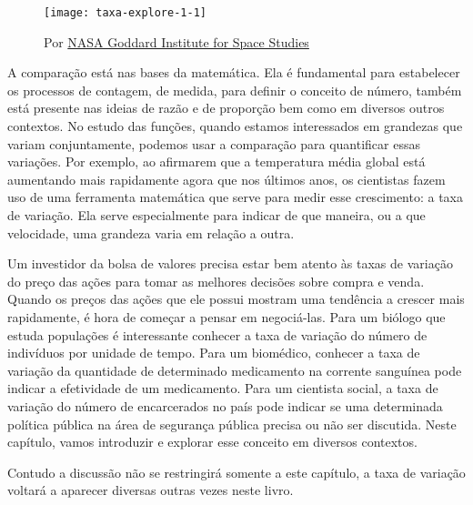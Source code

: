 \mainmatter

\explore{}

\begin{figure}[H]
\centering
\texttt{[image: taxa-explore-1-1]}

\caption{Por \href{http://data.giss.nasa.gov/gistemp/graphs/}{NASA Goddard Institute for Space Studies}}
\label{}
\end{figure}

A comparação está nas bases da matemática. Ela é fundamental para estabelecer os processos de contagem, de medida, para definir o conceito de número, também está presente nas ideias de razão e de proporção bem como em diversos outros contextos. No estudo das funções, quando estamos interessados em grandezas que variam conjuntamente, podemos usar a comparação para quantificar essas variações. Por exemplo, ao afirmarem que a temperatura média global está aumentando mais rapidamente agora que nos últimos anos, os cientistas fazem uso de uma ferramenta matemática que serve para medir esse crescimento: a taxa de variação. Ela serve especialmente para indicar de que maneira, ou a que velocidade, uma grandeza varia em relação a outra. 

Um investidor da bolsa de valores precisa estar bem atento às taxas de variação do preço das ações para tomar as melhores decisões sobre compra e venda. Quando os preços das ações que ele possui mostram uma tendência a crescer mais rapidamente, é hora de começar a pensar em negociá-las. Para um biólogo que estuda populações é interessante conhecer a taxa de variação do número de indivíduos por unidade de tempo. Para um biomédico, conhecer a taxa de variação da quantidade de determinado medicamento na corrente sanguínea pode indicar a efetividade de um medicamento. Para um cientista social, a taxa de variação do número de encarcerados no país pode indicar se uma determinada política pública na área de segurança pública precisa ou não ser discutida. Neste capítulo, vamos introduzir e explorar esse conceito em diversos contextos. 

Contudo a discussão não se restringirá somente a este capítulo, a taxa de variação voltará a aparecer diversas outras vezes neste livro.

